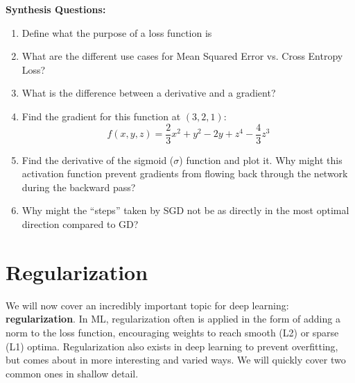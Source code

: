 \begin{questionbox}
    \textbf{Synthesis Questions:}
    \begin{enumerate}
        \item Define what the purpose of a loss function is
        \item What are the different use cases for Mean Squared Error vs. Cross Entropy Loss?
        \item What is the difference between a derivative and a gradient?
        \item Find the gradient for this function at $(3, 2, 1)$:
        $$f(x,y,z) = \frac{2}{3}x^2 + y^2 - 2y + z^4 - \frac{4}{3}z^3$$
        \item Find the derivative of the sigmoid ($\sigma$) function and plot it. Why might this activation function prevent gradients from flowing back through the network during the backward pass?
        \item Why might the ``steps'' taken by SGD not be as directly in the most optimal direction compared to GD?
    \end{enumerate}
\end{questionbox}

\section{Regularization}
\begin{flushleft}
    \large We will now cover an incredibly important topic for deep learning: \textbf{regularization}. In ML, regularization often is applied in the form of adding a norm to the loss function, encouraging weights to reach smooth (L2) or sparse (L1) optima. Regularization also exists in deep learning to prevent overfitting, but comes about in more interesting and varied ways. We will quickly cover two common ones in shallow detail.
\end{flushleft}

